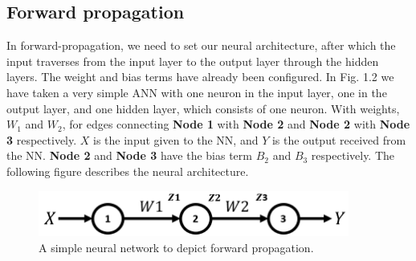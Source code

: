\documentclass[12pt,a4paper,bold]{thesis}
\theoremstyle{thm}
\theoremstyle{definition}
\begin{document}
\subsection{Forward propagation}
\indent\indent In forward-propagation, we need to set our neural architecture, after which the input traverses from the input layer to the output layer through the hidden layers. The weight and bias terms have already been configured. In Fig. 1.2 we have taken a very simple ANN with one neuron in the input layer, one in the output layer, and one hidden layer, which consists of one neuron. With weights, $W_1$ and $W_2$, for edges connecting \textbf{Node 1} with \textbf{Node 2} and \textbf{Node 2} with \textbf{Node 3} respectively. $X$ is the input given to the NN, and $Y$ is the output received from the NN. \textbf{Node 2} and \textbf{Node 3} have the bias term \textbf{$B_2$} and \textbf{$B_3$} respectively. The following figure describes the neural architecture.

\begin{figure}[H]
	\centering
   \includegraphics[height=1.5cm]{Images/34.png} 
   \caption{A simple neural network to depict forward propagation.}
\end{figure}
\end{document}
